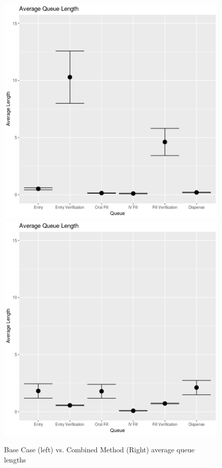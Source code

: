 \documentclass[10pt]{report}            %
\begin{document}
\begin{figure}[H]
\centering
\includegraphics[scale=.35]{BaseQueueCIs.png}
\includegraphics[scale=.35]{SmartQueueCIs.png}
\caption{Base Case (left) vs. Combined Method (Right) average queue lengths}
\label{fig:basevsmart}
\end{figure}
\end{document}
